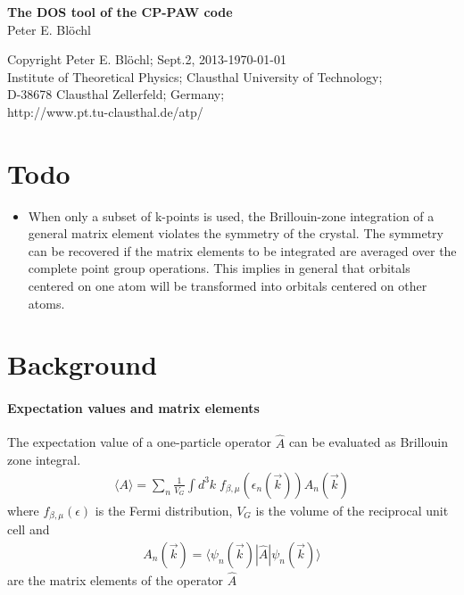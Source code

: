 \documentclass[11pt,a4paper]{report}
\begin{document}
\begin{titlepage}
\begin{center}
\vspace*{3.5cm}
{\huge \textbf{The DOS tool of the CP-PAW code}}\\
\vspace{0.5cm}
{\large Peter E. Bl\"ochl}
\vspace{0.5cm} 
\end{center}

\vfill
\begin{center}
Copyright Peter E. Bl\"ochl; Sept.2, 2013-\today\\
{\small
Institute of Theoretical Physics;
Clausthal University of Technology;\\ 
D-38678 Clausthal Zellerfeld; Germany;\\
http://www.pt.tu-clausthal.de/atp/}
\end{center}
\end{titlepage}
\noindent            
\tableofcontents
\chapter{Todo}
\begin{itemize}
\item When only a subset of k-points is used, the Brillouin-zone
  integration of a general matrix element violates the symmetry of the
  crystal.  The symmetry can be recovered if the matrix elements to be
  integrated are averaged over the complete point group
  operations. This implies in general that orbitals centered on one
  atom will be transformed into orbitals centered on other atoms.
\end{itemize}
\chapter{Background}
\subsubsection{Expectation values and matrix elements}
The expectation value of a one-particle operator $\hat{A}$ can be evaluated
as Brillouin zone integral.
\begin{eqnarray}
\langle{A}\rangle
=\sum_n\frac{1}{V_G}\int d^3k\; f_{\beta,\mu}(\epsilon_n(\vec{k}))
A_{n}(\vec{k})
\end{eqnarray}
where $f_{\beta,\mu}(\epsilon)$ is the Fermi distribution, $V_G$ is
the volume of the reciprocal unit cell and
\begin{eqnarray}
A_{n}(\vec{k})=\langle\psi_n(\vec{k})|\hat{A}|\psi_n(\vec{k})\rangle
\end{eqnarray}
are the matrix elements of the operator $\hat{A}$
\end{document}
